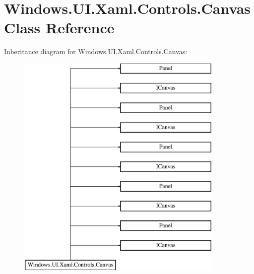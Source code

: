 \hypertarget{class_windows_1_1_u_i_1_1_xaml_1_1_controls_1_1_canvas}{}\section{Windows.\+U\+I.\+Xaml.\+Controls.\+Canvas Class Reference}
\label{class_windows_1_1_u_i_1_1_xaml_1_1_controls_1_1_canvas}
Inheritance diagram for Windows.\+U\+I.\+Xaml.\+Controls.\+Canvas\+:\begin{figure}[H]
\begin{center}
\leavevmode
\includegraphics[height=11.000000cm]{class_windows_1_1_u_i_1_1_xaml_1_1_controls_1_1_canvas}
\end{center}
\end{figure}
